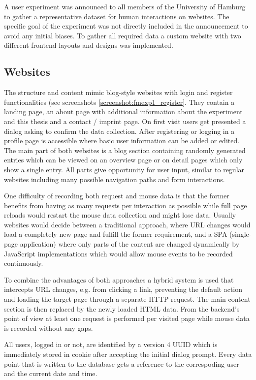 \documentclass[
    fontsize=12pt,
    headings=small,
    parskip=half,           %
    bibliography=totoc,
    numbers=noenddot,       %
    open=any,               %
    final,                   %
    table
]{scrreprt}
\begin{document}
A user experiment was announced to all members of the University of Hamburg to gather a representative dataset for human interactions on websites. The specific goal of the experiment was not directly included in the announcement to avoid any initial biases. To gather all required data a custom website with two different frontend layouts and designs was implemented.

\label{concept_websites}
\subsection{Websites}

The structure and content mimic blog-style websites with login and register functionalities (see screenshots \ref{screenshot:fmexp1_register}. They contain a landing page, an about page with additional information about the experiment and this thesis and a contact / imprint page. On first visit users get presented a dialog asking to confirm the data collection. After registering or logging in a profile page is accessible where basic user information can be added or edited. The main part of both websites is a blog section containing randomly generated entries which can be viewed on an overview page or on detail pages which only show a single entry.
All parts give opportunity for user input, similar to regular websites including many possible navigation paths and form interactions.

One difficulty of recording both request and mouse data is that the former benefits from having as many requests per interaction as possible while full page reloads would restart the mouse data collection and might lose data. Usually websites would decide between a traditional approach, where URL changes would load a completely new page and fulfill the former requirement, and a SPA (single-page application) where only parts of the content are changed dynamically by JavaScript implementations which would allow mouse events to be recorded continuously.

To combine the advantages of both approaches a hybrid system is used that intercepts URL changes, e.g. from clicking a link, preventing the default action and loading the target page through a separate HTTP request. The main content section is then replaced by the newly loaded HTML data. From the backend's point of view at least one request is performed per visited page while mouse data is recorded without any gaps.

All users, logged in or not, are identified by a version 4 UUID which is immediately stored in cookie after accepting the initial dialog prompt. Every data point that is written to the database gets a reference to the correspoding user and the current date and time.
\end{document}
